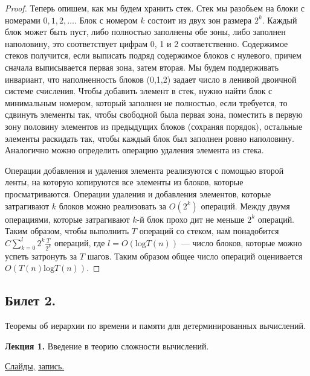 \documentclass[a4paper]{article}
\newcommand{\mybox}{%
    \collectbox{%
        \setlength{\fboxsep}{1pt}%
        \fbox{\BOXCONTENT}%
    }%
}
\theoremstyle{indented}
\theoremstyle{definition}
\theoremstyle{remark}
\begin{document}
\begin{proof}
    Теперь опишем, как мы будем хранить стек. Стек мы разобьем на блоки с номерами $0,1,2,\ldots$. Блок с номером $k$ состоит из двух зон размера $2^k$. Каждый блок может быть пуст, либо полностью заполнены обе зоны, либо заполнен наполовину, это соответствует цифрам 0, 1 и 2 соответственно. Содержимое стеков получится, если выписать подряд содержимое блоков с нулевого, причем сначала выписывается первая зона, затем вторая. Мы будем поддерживать инвариант, что наполненность блоков (0,1,2) задает число в ленивой двоичной системе счисления. Чтобы добавить элемент в стек, нужно найти блок с минимальным номером, который заполнен не полностью, если требуется, то сдвинуть элементы так, чтобы свободной была первая зона, поместить в первую зону половину элементов из предыдущих блоков (сохраняя порядок), остальные элементы раскидать так, чтобы каждый блок был заполнен ровно наполовину. Аналогично можно определить операцию удаления элемента из стека.
    
    Операции добавления и удаления элемента реализуются с помощью второй ленты, на которую копируются все элементы из блоков, которые просматриваются. Операции удаления и добавления элементов, которые затрагивают $k$ блоков можно реализовать за $O(2^k)$ операций. Между двумя операциями, которые затрагивают $k$-й блок прохо дит не меньше $2^k$ операций. Таким образом, чтобы выполнить $T$ операций со стеком, нам понадобится $C \sum_{k=0}^l  2^k \frac{T}{2^k}$ операций, где $l  = O(\mathrm{l}\mathrm{o}\mathrm{g} T (n))$ — число блоков, которые можно успеть затронуть за $T$ шагов. Таким образом общее число операций оценивается $O(T (n) \mathrm{l}\mathrm{o}\mathrm{g} T (n))$.
\end{proof}



\newpage 

\subsection{Билет 2.}

Теоремы об иерархии по времени и памяти для детерминированных вычислений.

\hrulefill

\textbf{Лекция 1.} Введение в теорию сложности вычислений.

\begin{flushright}
    \mybox{
        \href{https://drive.google.com/file/d/1cErhF8-5Pa9wFzmlXf9YcYOunX7_Khty/view?usp=sharing}{Слайды,}
        \href{https://disk.yandex.ru/d/knoQ44wLmGDwwQ/2021-2022%20учебный%20год%20(осенний%20семестр)/2%20курс/Теоретическая%20информатика/M2021-10-27_111615_1h35m_102.mp4}{запись.}
    }
\end{flushright}
\end{document}
